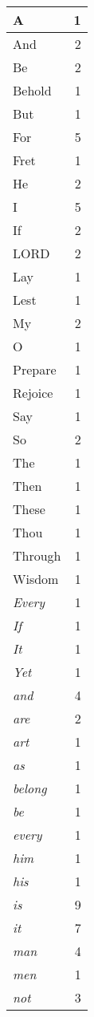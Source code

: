 \begin{center}
\begin{longtable}{l|r}
A & 1\\ \hline 
And & 2\\ \hline 
Be & 2\\ \hline 
Behold & 1\\ \hline 
But & 1\\ \hline 
For & 5\\ \hline 
Fret & 1\\ \hline 
He & 2\\ \hline 
I & 5\\ \hline 
If & 2\\ \hline 
LORD & 2\\ \hline 
Lay & 1\\ \hline 
Lest & 1\\ \hline 
My & 2\\ \hline 
O & 1\\ \hline 
Prepare & 1\\ \hline 
Rejoice & 1\\ \hline 
Say & 1\\ \hline 
So & 2\\ \hline 
The & 1\\ \hline 
Then & 1\\ \hline 
These & 1\\ \hline 
Thou & 1\\ \hline 
Through & 1\\ \hline 
Wisdom & 1\\ \hline 
\emph{Every} & 1\\ \hline 
\emph{If} & 1\\ \hline 
\emph{It} & 1\\ \hline 
\emph{Yet} & 1\\ \hline 
\emph{and} & 4\\ \hline 
\emph{are} & 2\\ \hline 
\emph{art} & 1\\ \hline 
\emph{as} & 1\\ \hline 
\emph{belong} & 1\\ \hline 
\emph{be} & 1\\ \hline 
\emph{every} & 1\\ \hline 
\emph{him} & 1\\ \hline 
\emph{his} & 1\\ \hline 
\emph{is} & 9\\ \hline 
\emph{it} & 7\\ \hline 
\emph{man} & 4\\ \hline 
\emph{men} & 1\\ \hline 
\emph{not} & 3\\ \hline 

\end{longtable}
\end{center}
